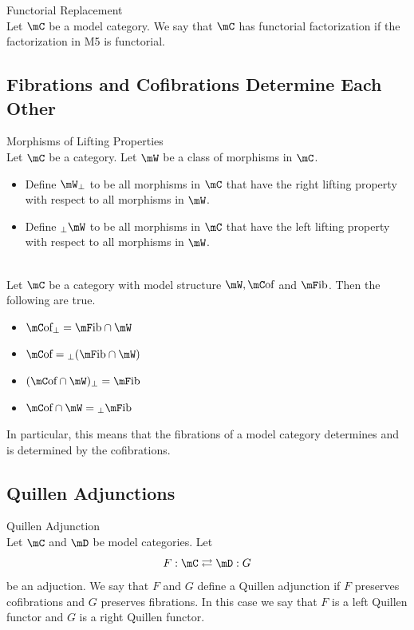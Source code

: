 \documentclass[a4paper]{article}
\begin{document}
\begin{defn}{Functorial Replacement}{}\\
Let $\mC$ be a model category. We say that $\mC$ has functorial factorization if the factorization in M5 is functorial. 
\end{defn}

\subsection{Fibrations and Cofibrations Determine Each Other}
\begin{defn}{Morphisms of Lifting Properties}{}\\ Let $\mC$ be a category. Let $\mW$ be a class of morphisms in $\mC$. 
\begin{itemize}
\item Define $\mW_\perp$ to be all morphisms in $\mC$ that have the right lifting property with respect to all morphisms in $\mW$. 
\item Define ${_\perp\mW}$ to be all morphisms in $\mC$ that have the left lifting property with respect to all morphisms in $\mW$. 
\end{itemize}
\end{defn}

\begin{thm}{}{}\\ Let $\mC$ be a category with model structure $\mW,\mC\text{of}$ and $\mF\text{ib}$. Then the following are true. 
\begin{itemize}
\item $\mC\text{of}_\perp=\mF\text{ib}\cap\mW$
\item $\mC\text{of}={_\perp(\mF\text{ib}\cap\mW)}$
\item $(\mC\text{of}\cap\mW)_\perp=\mF\text{ib}$
\item $\mC\text{of}\cap\mW={_\perp\mF\text{ib}}$
\end{itemize}
In particular, this means that the fibrations of a model category determines and is determined by the cofibrations. 
\end{thm}

\subsection{Quillen Adjunctions}
\begin{defn}{Quillen Adjunction}{}\\ Let $\mC$ and $\mD$ be model categories. Let $$F:\mC\rightleftarrows\mD:G$$ be an adjuction. We say that $F$ and $G$ define a Quillen adjunction if $F$ preserves cofibrations and $G$ preserves fibrations. In this case we say that $F$ is a left Quillen functor and $G$ is a right Quillen functor. 
\end{defn}
\end{document}
